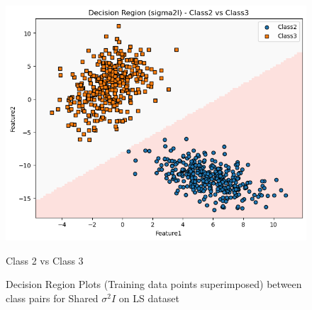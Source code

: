 \begin{figure}[H]
\begin{minipage}{0.32\linewidth}
        \includegraphics[width=\linewidth]{images/LS_Group04_images/01_sigma2i/04_decision_region_c2_c3.png}
        \caption*{Class 2 vs Class 3}
    \end{minipage}
    \caption{Decision Region Plots (Training data points superimposed) between class pairs for Shared $\sigma^2 I$ on LS dataset}
\end{figure}
